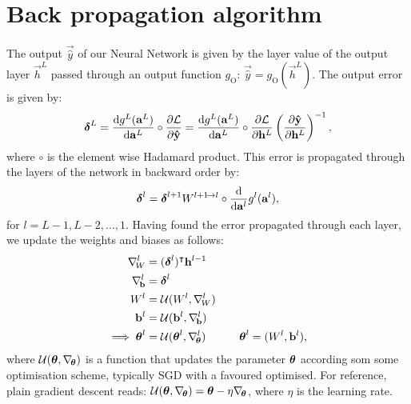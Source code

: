 \section{Back propagation algorithm}\label{app:backprop}
    The output $\vec{\hat{y}}$ of our Neural Network is given by the layer value of the output layer $\vec{h}^L$ passed through an output function $g_\mathrm{O}$: $\vec{\hat{y}} = g_\mathrm{O}(\vec{h}^L)$. The output error  is given by:
    \begin{equation}\label{eq:app_backprop_output_error}
        \boldsymbol{\delta}^L = \dv{g^L(\mathbf{a}^L)}{\mathbf{a}^L} \circ \pdv{\mathcal{L}}{\mathbf{\hat{y}}} =\dv{g^L(\mathbf{a}^L)}{\mathbf{a}^L} \circ \pdv{\mathcal{L}}{\mathbf{h}^L}\left( \pdv{\mathbf{\hat{y}}}{\mathbf{h}^L} \right)^{-1},
    \end{equation}
    where $\circ$ is the element wise Hadamard product. This error is propagated through the layers of the network in backward order by:
    \begin{equation}\label{eq:app_backprop_prop_error}
        \boldsymbol{\delta}^l = \boldsymbol{\delta}^{l+1}W^{l+1\!\to l} \circ \dv{}{\mathbf{a}^l}g^l(\mathbf{a}^l),
    \end{equation}
    for $l=L-1, L-2,\dots, 1$. Having found the error propagated through each layer, we update the weights and biases as follows:
    \begin{equation}\label{eq:app_backprop_update}
        \begin{split}
            \nabla_{\!W}^l &= (\boldsymbol{\delta}^l)^\intercal\mathbf{h}^{l-1} \\
            \nabla_{\!\mathbf{b}}^l &= \boldsymbol{\delta}^l \\
            W^l &= \mathcal{U}(W^l, \nabla_{\!W}^l)\\
            \mathbf{b}^l &= \mathcal{U}(\mathbf{b}^l, \nabla_{\!\mathbf{b}}^l) \\
            \implies \boldsymbol{\theta}^l &= \mathcal{U}(\boldsymbol{\theta}^l, \nabla_{\!\boldsymbol{\theta}}^l) \quad\quad\quad \boldsymbol{\theta}^l = (W^l, \mathbf{b}^l)
,        \end{split}
    \end{equation}
    where $\mathcal{U}(\boldsymbol{\theta}, \nabla_{\!\boldsymbol{\theta}})$ is a function that updates the parameter $\boldsymbol{\theta}$ according som some optimisation scheme, typically SGD with a favoured optimised. For reference, plain gradient descent reads: $\mathcal{U}(\boldsymbol{\theta}, \nabla_{\!\boldsymbol{\theta}}) = \boldsymbol{\theta} - \eta\nabla_{\!\boldsymbol{\theta}}$, where $\eta$ is the learning rate. 
